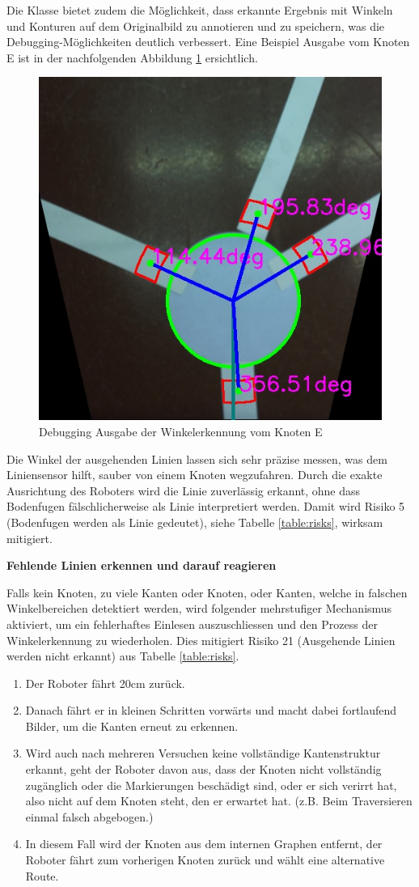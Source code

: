Die Klasse bietet zudem die Möglichkeit, dass erkannte Ergebnis mit Winkeln und Konturen auf dem Originalbild zu annotieren und zu speichern, was die Debugging-Möglichkeiten deutlich verbessert. Eine Beispiel Ausgabe vom Knoten E ist in der nachfolgenden Abbildung \ref{fig:angle-reader-debug-output} ersichtlich.

\begin{figure}[H]
    \centering
    \includegraphics[width=0.5\linewidth]{assets/IT/250525_204610_test_annotated_angles_of_E.jpg}
    \caption{Debugging Ausgabe der Winkelerkennung vom Knoten E}
    \label{fig:angle-reader-debug-output}
\end{figure}

Die Winkel der ausgehenden Linien lassen sich sehr präzise messen, was dem Liniensensor hilft, sauber von einem Knoten wegzufahren. Durch die exakte Ausrichtung des Roboters wird die Linie zuverlässig erkannt, ohne dass Bodenfugen fälschlicherweise als Linie interpretiert werden. Damit wird Risiko 5 (Bodenfugen werden als Linie gedeutet), siehe Tabelle \ref{table:risks}, wirksam mitigiert.


\textbf{Fehlende Linien erkennen und darauf reagieren}

Falls kein Knoten, zu viele Kanten oder Knoten, oder Kanten, welche in falschen Winkelbereichen detektiert werden, wird folgender mehrstufiger Mechanismus aktiviert, um ein fehlerhaftes Einlesen auszuschliessen und den Prozess der Winkelerkennung zu wiederholen. Dies mitigiert Risiko 21 (Ausgehende Linien werden nicht erkannt) aus Tabelle \ref{table:risks}.

\begin{enumerate}
    \item Der Roboter fährt 20cm zurück.
    \item Danach fährt er in kleinen Schritten vorwärts und macht dabei fortlaufend Bilder, um die Kanten erneut zu erkennen.
    \item Wird auch nach mehreren Versuchen keine vollständige Kantenstruktur erkannt, geht der Roboter davon aus, dass der Knoten nicht vollständig zugänglich oder die Markierungen beschädigt sind, oder er sich verirrt hat, also nicht auf dem Knoten steht, den er erwartet hat. (z.B. Beim Traversieren einmal falsch abgebogen.)
    \item In diesem Fall wird der Knoten aus dem internen Graphen entfernt, der Roboter fährt zum vorherigen Knoten zurück und wählt eine alternative Route.
\end{enumerate}

